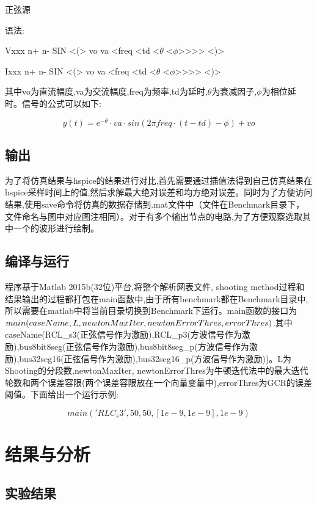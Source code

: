 \documentclass[12pt]{article}
\begin{document}
\begin{sloppypar}
\qquad 正弦源

\qquad 语法:

\qquad Vxxx n+ n- SIN <(> vo va <freq <td <$\theta$ <$\phi$>>>> <)>

\qquad Ixxx n+ n- SIN <(> vo va <freq <td <$\theta$ <$\phi$>>>> <)>

\qquad 其中vo为直流幅度,va为交流幅度,freq为频率,td为延时,$\theta$为衰减因子,$\phi$为相位延时。信号的公式可以如下:

\begin{equation}
  y(t) = e^{-\theta}\cdot va \cdot sin(2\pi freq \cdot(t-td) - \phi) + vo
\end{equation}


\subsection{输出}
\qquad 为了将仿真结果与hspice的结果进行对比,首先需要通过插值法得到自己仿真结果在hspice采样时间上的值,然后求解最大绝对误差和均方绝对误差。同时为了方便访问结果,使用save命令将仿真的数据存储到.mat文件中（文件在Benchmark目录下，文件命名与图中对应图注相同）。对于有多个输出节点的电路,为了方便观察选取其中一个的波形进行绘制。

\subsection{编译与运行}
\qquad 程序基于Matlab 2015b(32位)平台,将整个解析网表文件, shooting method过程和结果输出的过程都打包在main函数中,由于所有benchmark都在Benchmark目录中,所以需要在matlab中将当前目录切换到Benchmark下运行。main函数的接口为$main(caseName, L, \\ newtonMaxIter, newtonErrorThres, errorThres)$.其中caseName(RCL\_s3(正弦信号作为激励),RCL\_p3(方波信号作为激励),bus8bit8seg(正弦信号作为激励),bus8bit8seg\_p(方波信号作为激励),bus32seg16(正弦信号作为激励),bus32seg16\_p(方波信号作为激励))。L为Shooting的分段数,newtonMaxIter, newtonErrorThres为牛顿迭代法中的最大迭代轮数和两个误差容限(两个误差容限放在一个向量变量中),errorThres为GCR的误差阈值。下面给出一个运行示例:

\begin{equation}
  main('RLC_s3',50,50,[1e-9, 1e-9],1e-9)
\end{equation}

\section{结果与分析}
\subsection{实验结果}


\end{sloppypar}
\end{document}
